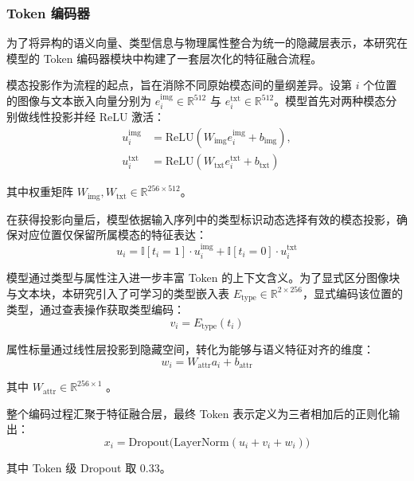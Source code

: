 \subsubsection{Token 编码器}

为了将异构的语义向量、类型信息与物理属性整合为统一的隐藏层表示，本研究在模型的 Token 编码器模块中构建了一套层次化的特征融合流程。

模态投影作为流程的起点，旨在消除不同原始模态间的量纲差异。设第 $ i $ 个位置的图像与文本嵌入向量分别为 $ e_i^{\text{img}}\in\mathbb{R}^{512} $ 与 $ e_i^{\text{txt}}\in\mathbb{R}^{512} $。模型首先对两种模态分别做线性投影并经 ReLU 激活：
\begin{equation}
\begin{aligned}
u_i^{\text{img}}&=\text{ReLU}(W_{\text{img}}e_i^{\text{img}}+b_{\text{img}}), \\
u_i^{\text{txt}}&=\text{ReLU}(W_{\text{txt}}e_i^{\text{txt}}+b_{\text{txt}})
\end{aligned}
\end{equation}

其中权重矩阵 $ W_{\text{img}},W_{\text{txt}}\in\mathbb{R}^{256\times 512} $。

在获得投影向量后，模型依据输入序列中的类型标识动态选择有效的模态投影，确保对应位置仅保留所属模态的特征表达：
\begin{equation}
u_i=\mathbb{I}[t_i=1]\cdot u_i^{\text{img}}+\mathbb{I}[t_i=0]\cdot u_i^{\text{txt}}
\end{equation}

模型通过类型与属性注入进一步丰富 Token 的上下文含义。为了显式区分图像块与文本块，本研究引入了可学习的类型嵌入表 $ E_{\text{type}}\in\mathbb{R}^{2\times 256} $，显式编码该位置的类型，通过查表操作获取类型编码：
\begin{equation}
v_i=E_{\text{type}}(t_i)
\end{equation}

属性标量通过线性层投影到隐藏空间，转化为能够与语义特征对齐的维度：
\begin{equation}
w_i=W_{\text{attr}}a_i+b_{\text{attr}}
\end{equation}

其中 $ W_{\text{attr}}\in\mathbb{R}^{256\times 1} $ 。

整个编码过程汇聚于特征融合层，最终 Token 表示定义为三者相加后的正则化输出：
\begin{equation}
x_i=\text{Dropout}\big(\text{LayerNorm}(u_i+v_i+w_i)\big)
\end{equation}

其中 Token 级 Dropout 取 0.33。

